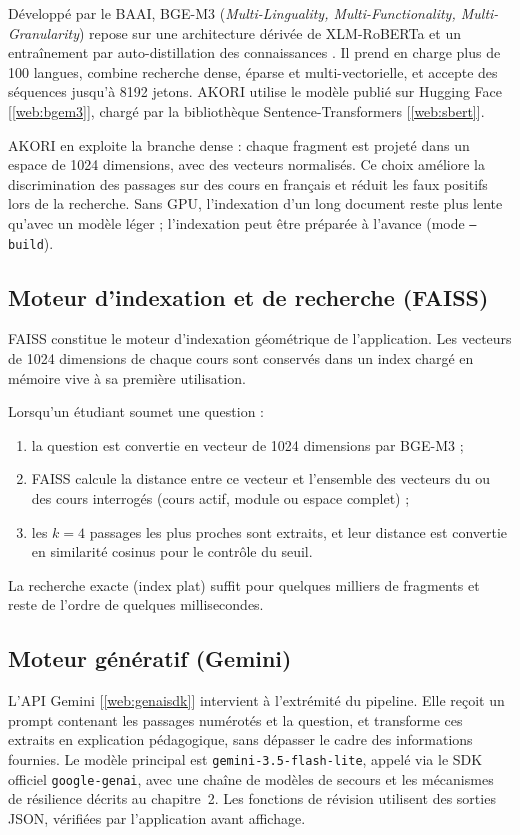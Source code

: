 \documentclass[12pt,a4paper,oneside]{report}
\newcommand{\webref}[1]{[\ref{web:#1}]}
\begin{document}
Développé par le BAAI, BGE-M3 (\emph{Multi-Linguality, Multi-Functionality, Multi-Granularity}) repose sur une architecture dérivée de XLM-RoBERTa et un entraînement par auto-distillation des connaissances \cite{chen2024bgem3}. Il prend en charge plus de 100 langues, combine recherche dense, éparse et multi-vectorielle, et accepte des séquences jusqu'à 8192 jetons. AKORI utilise le modèle publié sur Hugging Face \webref{bgem3}, chargé par la bibliothèque Sentence-Transformers \webref{sbert}.

AKORI en exploite la branche dense : chaque fragment est projeté dans un espace de 1024 dimensions, avec des vecteurs normalisés. Ce choix améliore la discrimination des passages sur des cours en français et réduit les faux positifs lors de la recherche. Sans GPU, l'indexation d'un long document reste plus lente qu'avec un modèle léger ; l'indexation peut être préparée à l'avance (mode \texttt{--build}).

\subsection{Moteur d'indexation et de recherche (FAISS)}

FAISS constitue le moteur d'indexation géométrique de l'application. Les vecteurs de 1024 dimensions de chaque cours sont conservés dans un index chargé en mémoire vive à sa première utilisation.

Lorsqu'un étudiant soumet une question :
\begin{enumerate}[nosep]
  \item la question est convertie en vecteur de 1024 dimensions par BGE-M3 ;
  \item FAISS calcule la distance entre ce vecteur et l'ensemble des vecteurs du ou des cours interrogés (cours actif, module ou espace complet) ;
  \item les $k = 4$ passages les plus proches sont extraits, et leur distance est convertie en similarité cosinus pour le contrôle du seuil.
\end{enumerate}
La recherche exacte (index plat) suffit pour quelques milliers de fragments et reste de l'ordre de quelques millisecondes.

\subsection{Moteur génératif (Gemini)}

L'API Gemini \webref{genaisdk} intervient à l'extrémité du pipeline. Elle reçoit un prompt contenant les passages numérotés et la question, et transforme ces extraits en explication pédagogique, sans dépasser le cadre des informations fournies. Le modèle principal est \texttt{gemini-3.5-flash-lite}, appelé via le SDK officiel \texttt{google-genai}, avec une chaîne de modèles de secours et les mécanismes de résilience décrits au chapitre~2. Les fonctions de révision utilisent des sorties JSON, vérifiées par l'application avant affichage.
\end{document}
